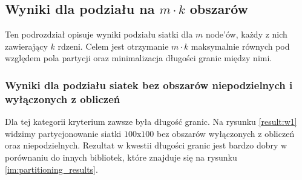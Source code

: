 \subsection{Wyniki dla podziału na $m \cdot k$ obszarów}
Ten podrozdział opisuje wyniki podziału siatki dla $m$ node'ów, każdy z nich zawierający $k$ rdzeni.
Celem jest otrzymanie $m \cdot k$ maksymalnie równych pod względem pola partycji oraz minimalizacja długości granic
między nimi.
\vspace{5mm}
\subsubsection{Wyniki dla podziału siatek bez obszarów niepodzielnych i wyłączonych z obliczeń}
Dla tej kategorii kryterium zawsze była długość granic.
Na rysunku \ref{result:w1} widzimy partycjonowanie siatki $100$x$100$ bez obszarów wyłączonych z obliczeń oraz
niepodzielnych.
Rezultat w kwestii długości granic jest bardzo dobry w porównaniu do innych bibliotek, które znajduje się na rysunku
\ref{im:partitioning_results}.
